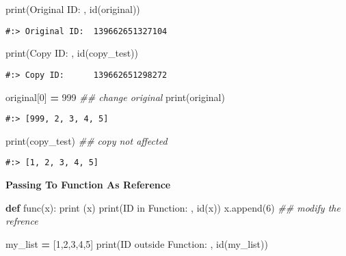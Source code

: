 \documentclass[
]{book}
\newenvironment{Shaded}{\begin{snugshade}}{\end{snugshade}}
\newcommand{\BuiltInTok}[1]{#1}
\newcommand{\CommentTok}[1]{\textcolor[rgb]{0.37,0.37,0.37}{\textit{#1}}}
\newcommand{\DecValTok}[1]{\textcolor[rgb]{0.06,0.06,0.06}{#1}}
\newcommand{\KeywordTok}[1]{\textcolor[rgb]{0.27,0.27,0.27}{\textbf{#1}}}
\newcommand{\NormalTok}[1]{#1}
\newcommand{\OperatorTok}[1]{\textcolor[rgb]{0.43,0.43,0.43}{\textbf{#1}}}
\newcommand{\StringTok}[1]{\textcolor[rgb]{0.5,0.5,0.5}{#1}}
\begin{document}
\begin{Shaded}
\begin{Highlighting}[]
\BuiltInTok{print}\NormalTok{(}\StringTok{\textquotesingle{}Original ID: \textquotesingle{}}\NormalTok{, }\BuiltInTok{id}\NormalTok{(original))}
\end{Highlighting}
\end{Shaded}

\begin{verbatim}
#:> Original ID:  139662651327104
\end{verbatim}

\begin{Shaded}
\begin{Highlighting}[]
\BuiltInTok{print}\NormalTok{(}\StringTok{\textquotesingle{}Copy ID:     \textquotesingle{}}\NormalTok{, }\BuiltInTok{id}\NormalTok{(copy\_test))}
\end{Highlighting}
\end{Shaded}

\begin{verbatim}
#:> Copy ID:      139662651298272
\end{verbatim}

\begin{Shaded}
\begin{Highlighting}[]
\NormalTok{original[}\DecValTok{0}\NormalTok{] }\OperatorTok{=} \DecValTok{999}  \CommentTok{\#\# change original}
\BuiltInTok{print}\NormalTok{(original)    }
\end{Highlighting}
\end{Shaded}

\begin{verbatim}
#:> [999, 2, 3, 4, 5]
\end{verbatim}

\begin{Shaded}
\begin{Highlighting}[]
\BuiltInTok{print}\NormalTok{(copy\_test)   }\CommentTok{\#\# copy not affected}
\end{Highlighting}
\end{Shaded}

\begin{verbatim}
#:> [1, 2, 3, 4, 5]
\end{verbatim}

\textbf{Passing To Function As Reference}

\begin{Shaded}
\begin{Highlighting}[]
\KeywordTok{def}\NormalTok{ func(x):}
    \BuiltInTok{print}\NormalTok{ (x)}
    \BuiltInTok{print}\NormalTok{(}\StringTok{\textquotesingle{}ID in Function:      \textquotesingle{}}\NormalTok{, }\BuiltInTok{id}\NormalTok{(x))}
\NormalTok{    x.append(}\DecValTok{6}\NormalTok{)    }\CommentTok{\#\# modify the refrence}
    
\NormalTok{my\_list }\OperatorTok{=}\NormalTok{ [}\DecValTok{1}\NormalTok{,}\DecValTok{2}\NormalTok{,}\DecValTok{3}\NormalTok{,}\DecValTok{4}\NormalTok{,}\DecValTok{5}\NormalTok{]}
\BuiltInTok{print}\NormalTok{(}\StringTok{\textquotesingle{}ID outside Function: \textquotesingle{}}\NormalTok{, }\BuiltInTok{id}\NormalTok{(my\_list))}
\end{Highlighting}
\end{Shaded}
\end{document}
